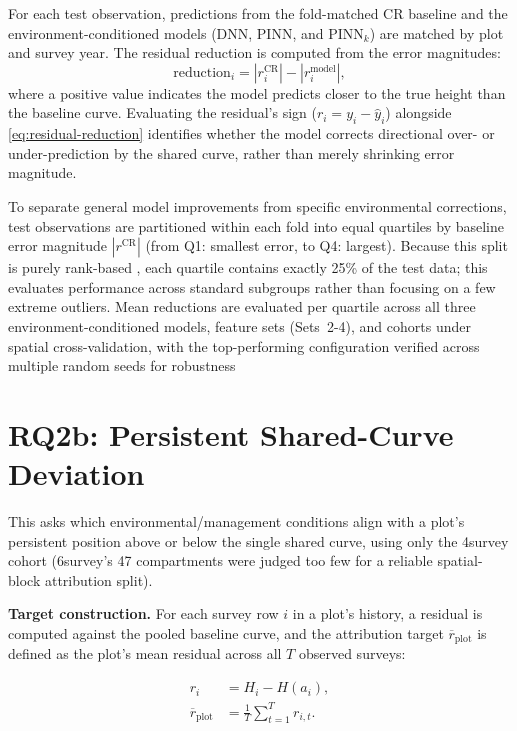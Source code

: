 \documentclass[logo,msc,ai]{infthesis}           %
\begin{document}
For each test observation, predictions from the fold-matched CR baseline and the environment-conditioned models (DNN, PINN, and PINN$_k$) are matched by plot and survey year. The residual reduction is computed from the error magnitudes:
\begin{equation}
\text{reduction}_i = \left|r_i^{\text{CR}}\right| - \left|r_i^{\text{model}}\right|,
\label{eq:residual-reduction}
\end{equation}
where a positive value indicates the model predicts closer to the true height than the baseline curve. Evaluating the residual's sign ($r_i = y_i - \hat{y}_i$) alongside \eqref{eq:residual-reduction} identifies whether the model corrects directional over- or under-prediction by the shared curve, rather than merely shrinking error magnitude.

To separate general model improvements from specific environmental corrections, test observations are partitioned within each fold into equal quartiles by baseline error magnitude $|r^{\text{CR}}|$ (from Q1: smallest error, to Q4: largest). Because this split is purely rank-based %
, each quartile contains exactly 25\% of the test data; this evaluates performance across standard subgroups rather than focusing on a few extreme outliers. Mean reductions are evaluated per quartile across all three environment-conditioned models, feature sets (Sets~2-4), and cohorts under spatial cross-validation, with the top-performing configuration verified across multiple random seeds for robustness %

\section{RQ2b: Persistent Shared-Curve Deviation}
\label{sec:rq2b}
This asks which environmental/management conditions align with a plot's persistent position above or below the single shared curve, using only the 4survey cohort (6survey's 47 compartments were judged too few for a reliable spatial-block attribution split).

\textbf{Target construction.}
For each survey row $i$ in a plot's history, a residual is computed against the pooled baseline curve, and the attribution target $\overline{r}_{\text{plot}}$ is defined as the plot's mean residual across all $T$ observed surveys:

\begin{subequations}
\label{eq:target-construction}
\begin{align}
    r_i &= H_i - H(a_i), \label{eq:cr-residual} \\
    \overline{r}_{\text{plot}} &= \frac{1}{T}\sum_{t=1}^{T} r_{i,t}. \label{eq:mean-cr-residual}
\end{align}
\end{subequations}
\end{document}

